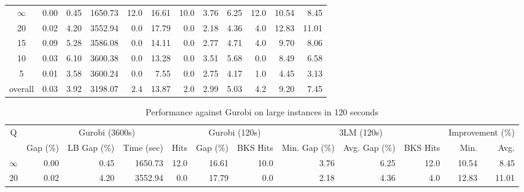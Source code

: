 \begin{table}[H]
\begin{tabular}{c rrrr rr rrr rr}
\cmidrule(lr){1-1} \cmidrule(lr){2-5} \cmidrule(lr){2-5} \cmidrule(lr){6-7} \cmidrule(lr){8-10} \cmidrule(lr){11-12}
$\infty$ &           0.00 &        0.45 &    1650.73 & 12.0 &         16.61 &     10.0 &          3.76 &          6.25 &     12.0 &            10.54 &  8.45 \\
      20 &           0.02 &        4.20 &    3552.94 &  0.0 &         17.79 &      0.0 &          2.18 &          4.36 &      4.0 &            12.83 & 11.01 \\
      15 &           0.09 &        5.28 &    3586.08 &  0.0 &         14.11 &      0.0 &          2.77 &          4.71 &      4.0 &             9.70 &  8.06 \\
      10 &           0.03 &        6.10 &    3600.38 &  0.0 &         13.28 &      0.0 &          3.51 &          5.68 &      0.0 &             8.49 &  6.58 \\
       5 &           0.01 &        3.58 &    3600.24 &  0.0 &          7.55 &      0.0 &          2.75 &          4.17 &      1.0 &             4.45 &  3.13 \\
\midrule
 overall &           0.03 &        3.92 &    3198.07 &  2.4 &         13.87 &      2.0 &          2.99 &          5.03 &      4.2 &             9.20 &  7.45 \\
\bottomrule
\end{tabular}
\end{table}\begin{table}[H]
\centering
\caption{Performance against Gurobi on large instances in 120 seconds}
\label{tab:3lm_resuts200T120}
\begin{tabular}{c rrrr rr rrr rr}
\toprule
       Q & \multicolumn{4}{c}{Gurobi (3600s)} & \multicolumn{2}{c}{Gurobi (120s)} & \multicolumn{3}{c}{3LM (120s)} & \multicolumn{2}{c}{Improvement (\%)} \\
         &       Gap (\%) & LB Gap (\%) & Time (sec) & Hits &      Gap (\%) & BKS Hits & Min. Gap (\%) & Avg. Gap (\%) & BKS Hits &             Min. &  Avg. \\
\cmidrule(lr){1-1} \cmidrule(lr){2-5} \cmidrule(lr){2-5} \cmidrule(lr){6-7} \cmidrule(lr){8-10} \cmidrule(lr){11-12}
$\infty$ &           0.00 &        0.45 &    1650.73 & 12.0 &         16.61 &     10.0 &          3.76 &          6.25 &     12.0 &            10.54 &  8.45 \\
      20 &           0.02 &        4.20 &    3552.94 &  0.0 &         17.79 &      0.0 &          2.18 &          4.36 &      4.0 &            12.83 & 11.01 \\

\end{tabular}
\end{table}
